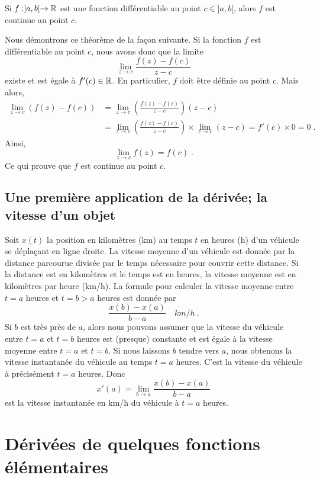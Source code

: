 {\begin{theorem}
Si $f:]a,b[\rightarrow \mathbb{R}$ est une fonction différentiable au point
$c\in ]a,b[$, alors $f$ est continue au point $c$.
\end{theorem}

Nous démontrons ce théorème de la façon suivante.  Si la fonction
$f$ est différentiable au point $c$, nous avons donc que la limite
\[
\lim_{z \rightarrow c} \frac{f(z)-f(c)}{z-c}
\]
existe et est égale à $f'(c) \in \mathbb{R}$.  En particulier, $f$ doit être
définie au point $c$.  Mais alors,
\begin{align*}
\lim_{z \rightarrow c} \left( f(z) - f(c) \right)
&= \lim_{z\rightarrow c} \left(\frac{f(z)-f(c)}{z-c}\right) (z-c) \\
&= \lim_{z\rightarrow c} \left(\frac{f(z)-f(c)}{z-c}\right)
\times \lim_{z\rightarrow c} (z-c)
= f'(c) \times 0 = 0 \; .
\end{align*}
Ainsi,
\[
\lim_{z\rightarrow c} f(z) = f(c) \; .
\]
Ce qui prouve que $f$ est continue au point $c$.

\subsection{Une première application de la dérivée; la vitesse d'un
  objet}

Soit $x(t)$ la position en kilomètres (km) au temps $t$ en heures (h)
d'un véhicule se déplaçant en ligne droite.  La vitesse moyenne d'un
véhicule est donnée par la distance parcourue divisée par le temps
nécessaire pour couvrir cette distance.  Si la distance est en
kilomètres et le temps est en heures, la vitesse moyenne est en
kilomètres par heure (km/h).  La formule pour calculer la vitesse
moyenne entre $t=a$ heures et $t=b>a$ heures est donnée par
\[
\frac{x(b)-x(a)}{b-a} \quad km/h \ .
\]
Si $b$ est très près de $a$, alors nous pouvons assumer que la vitesse du
véhicule entre $t=a$ et $t=b$ heures est (presque) constante et est
égale à la vitesse moyenne entre $t=a$ et $t=b$.  Si nous laissons $b$
tendre vers $a$, nous obtenons la vitesse instantanée du véhicule au
temps $t=a$ heures.  C'est la vitesse du véhicule à précisément $t=a$
heures.  Donc
\[
x'(a) = \lim_{b\rightarrow a} \frac{x(b)-x(a)}{b-a}
\]
est la vitesse instantanée en km/h du véhicule à $t=a$ heures.  

\section{Dérivées de quelques fonctions élémentaires}
\label{basic_der}

}
